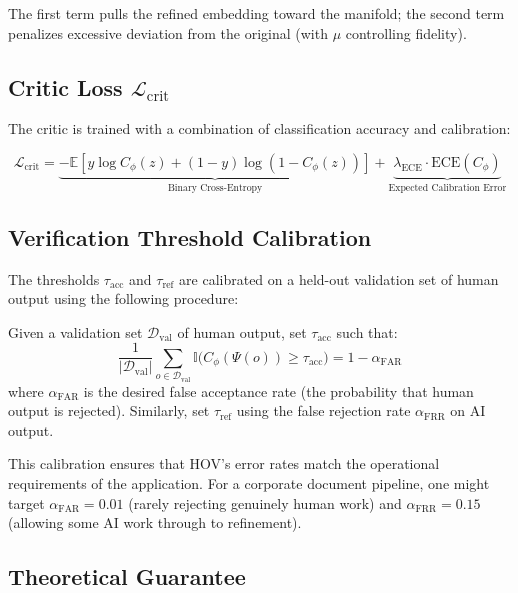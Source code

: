 \documentclass[12pt,oneside]{article}
\newcommand{\E}{\mathbb{E}}
\begin{document}
The first term pulls the refined embedding toward the manifold; the second term penalizes excessive deviation from the original (with $\mu$ controlling fidelity).

\subsection{Critic Loss $\mathcal{L}_\text{crit}$}

The critic is trained with a combination of classification accuracy and calibration:

\begin{equation}
\mathcal{L}_\text{crit} = \underbrace{-\E[y \log C_\phi(z) + (1-y) \log(1 - C_\phi(z))]}_{\text{Binary Cross-Entropy}} + \underbrace{\lambda_\text{ECE} \cdot \text{ECE}(C_\phi)}_{\text{Expected Calibration Error}}
\end{equation}

\subsection{Verification Threshold Calibration}

The thresholds $\tau_\text{acc}$ and $\tau_\text{ref}$ are calibrated on a held-out validation set of human output using the following procedure:

\begin{definition}
Given a validation set $\mathcal{D}_\text{val}$ of human output, set $\tau_\text{acc}$ such that:
\begin{equation}
\frac{1}{|\mathcal{D}_\text{val}|} \sum_{o \in \mathcal{D}_\text{val}} \mathbb{I}\big(C_\phi(\Psi(o)) \geq \tau_\text{acc}\big) = 1 - \alpha_\text{FAR}
\end{equation}
where $\alpha_\text{FAR}$ is the desired false acceptance rate (the probability that human output is rejected). Similarly, set $\tau_\text{ref}$ using the false rejection rate $\alpha_\text{FRR}$ on AI output.
\end{definition}

This calibration ensures that HOV's error rates match the operational requirements of the application. For a corporate document pipeline, one might target $\alpha_\text{FAR} = 0.01$ (rarely rejecting genuinely human work) and $\alpha_\text{FRR} = 0.15$ (allowing some AI work through to refinement).

\subsection{Theoretical Guarantee}
\end{document}
